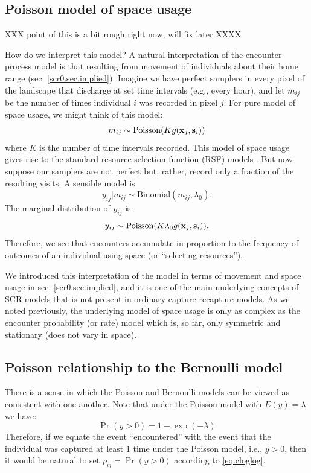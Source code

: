 \subsection{Poisson model of space usage}

XXX point of this is a bit rough right now, will fix later XXXX

How do we interpret this model?  A natural interpretation of the
encounter process model is that resulting from movement of individuals
about their home range (sec. \ref{scr0.sec.implied}).  Imagine we have
perfect samplers in every pixel of the landscape that discharge at set
time intervals (e.g., every hour), and let $m_{ij}$ be the number of
times individual $i$ was recorded in pixel $j$. For pure model of
space usage, we might think of this model:
\[
m_{ij} \sim  \mbox{Poisson}(K  g({\bf x}_{j},{\bf s}_{i}) )
\]
where $K$ is the number of time intervals recorded. This model of
space usage gives rise to the standard resource selection function
(RSF) models \citep[][and Chapt. \ref{chapt.rsf}]{royle_etal:2012mee}.
But now suppose our samplers are not perfect but, rather, record only
a fraction of the resulting visits. A sensible model is
\[
 y_{ij}|m_{ij} \sim \mbox{Binomial}(m_{ij}, \lambda_{0}).
\]
The marginal distribution of $y_{ij}$ is:
\[
 y_{ij} \sim \mbox{Poisson}(K \lambda_{0} g({\bf x}_{j},{\bf s}_{i}) ).
\]
Therefore, we see that encounters accumulate in proportion to the
frequency of outcomes of an individual using space (or ``selecting
resources'').

We introduced this interpretation of the model in terms of movement
and space usage in sec. \ref{scr0.sec.implied}, and it is one of the
main underlying concepts of SCR models that is not present in ordinary
capture-recapture models. As we noted previously, the underlying model
of space usage is only as complex as the encounter probability (or
rate) model which is, so far, only symmetric and stationary (does not
vary in space). 




\subsection{Poisson relationship to the Bernoulli model}
\label{poisson-mn.sec.approx}

There is a sense in which the Poisson and Bernoulli models can
be viewed as consistent with one another. Note that under the Poisson
model with $E(y) = \lambda$ we have:
\begin{equation}
 \Pr(y>0) = 1-\exp(-\lambda)
\label{eq.cloglog}
\end{equation}
Therefore, if we equate the event ``encountered'' with the event that
the individual was captured at least 1 time under the Poisson model,
i.e., $y>0$, then it would be natural to set $p_{ij} = \Pr(y>0)$
according to \ref{eq.cloglog}.

